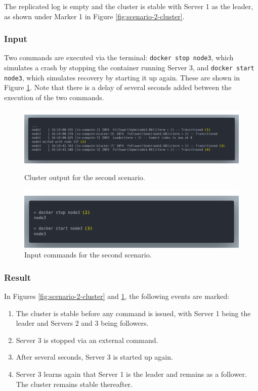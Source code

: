 The replicated log is empty and the cluster is stable with Server 1 as the leader, as shown under Marker 1 in Figure \ref{fig:scenario-2-cluster}.

\subsubsection{Input}

Two commands are executed via the terminal: \lstinline|docker stop node3|, which simulates a crash by stopping the container running Server 3, and \lstinline|docker start node3|, which simulates recovery by starting it up again. These are shown in Figure \ref{fig:scenario-2-commands}. Note that there is a delay of several seconds added between the execution of the two commands.

\begin{figure}[!ht]
\centering
\includegraphics[width=500pt]{images/scenario_2_cluster.png}
\caption{Cluster output for the second scenario.}
\label{fig:scenario-2-cluster}

\includegraphics[width=500pt]{images/scenario_2_commands.png}
\caption{Input commands for the second scenario.}
\label{fig:scenario-2-commands}
\end{figure}

\subsubsection{Result}

In Figures \ref{fig:scenario-2-cluster} and \ref{fig:scenario-2-commands}, the following events are marked:
\begin{enumerate}
    \item The cluster is stable before any command is issued, with Server 1 being the leader and Servers 2 and 3 being followers.
    \item Server 3 is stopped via an external command.
    \item After several seconds, Server 3 is started up again.
    \item Server 3 learns again that Server 1 is the leader and remains as a follower. The cluster remains stable thereafter.
\end{enumerate}

